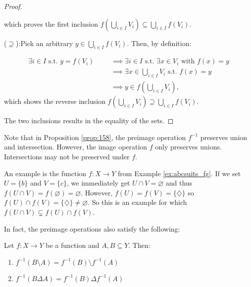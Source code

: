 \begin{proposition}
\begin{proof}
\begin{enumerate}
                \noindent which proves the first inclusion $f(\bigcup_{i \in I} V_i) \subseteq \bigcup_{i \in I} f(V_i)$.

                ($\supseteq$):\quad Pick an arbitrary $y \in \bigcup_{i \in I} f(V_i)$. Then, by definition:

                \begin{align*}
                    \exists i \in I \text{  s.t. } y = f(V_i)
                    & &&\implies \exists i \in I \text{  s.t. } \exists x \in V_i \text{  with } f(x) = y \\
                    & &&\implies \exists x \in \bigcup_{i \in I} V_i \text{  s.t. } f(x) = y \\
                    & &&\implies y \in f\left(\bigcup_{i \in I} V_i\right),
                \end{align*}
                \noindent which shows the reverse inclusion $f(\bigcup_{i \in I} V_i) \supseteq \bigcup_{i \in I} f(V_i)$.
        \end{enumerate}
        The two inclusions results in the equality of the sets.
    \end{proof}
    \label{prop:158}
\end{proposition}

\begin{remark}
    Note that in Proposition \ref{prop:158}, the preimage operation $f^{-1}$ preserves union and intersection. However, the image operation $f$ only preserves unions. Intersections may not be preserved under $f$.

    An example is the function $f : X \to Y$ from Example \ref{ex:abcsuits_fg}. If we set $U = \{b\}$ and $V = \{c\}$, we immediately get $U \cap V = \varnothing$ and thus $f(U \cap V) = f(\varnothing) = \varnothing$. However, $f(U) = f(V) = \{\diamondsuit\}$ so $f(U) \cap f(V) = \{\diamondsuit\} \neq \varnothing$. So this is an example for which $f(U \cap V) \subsetneq f(U) \cap f(V)$.
\end{remark}

In fact, the preimage operations also satisfy the following:

\begin{proposition} Let $f : X \to Y$ be a function and $A, B \subseteq Y$. Then:
\begin{enumerate}
    \item $f^{-1}(B \setminus A) = f^{-1}(B) \setminus f^{-1}(A)$
    \item $f^{-1}(B \Delta A) = f^{-1}(B) \Delta f^{-1}(A)$
\end{enumerate}
\end{proposition}

